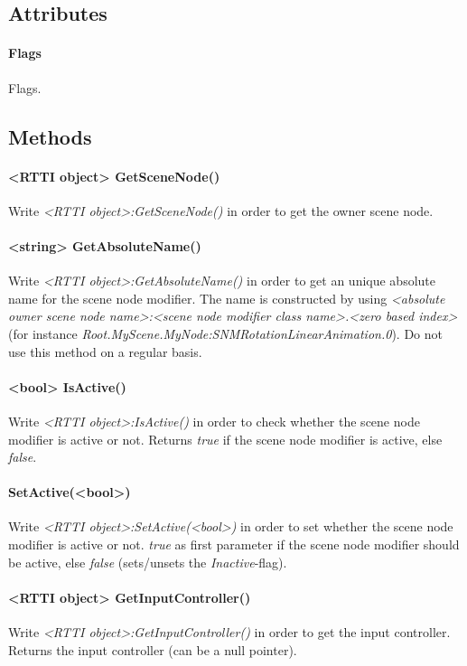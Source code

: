 \subsection{Attributes}

\paragraph{Flags}
Flags.


\subsection{Methods}

\paragraph{<RTTI object> GetSceneNode()}
Write \emph{<RTTI object>:GetSceneNode()} in order to get the owner scene node.

\paragraph{<string> GetAbsoluteName()}
Write \emph{<RTTI object>:GetAbsoluteName()} in order to get an unique absolute name for the scene node modifier. The name is constructed by using \emph{<absolute owner scene node name>:<scene node modifier class name>.<zero based index>} (for instance \emph{Root.MyScene.MyNode:SNMRotationLinearAnimation.0}). Do not use this method on a regular basis.

\paragraph{<bool> IsActive()}
Write \emph{<RTTI object>:IsActive()} in order to check whether the scene node modifier is active or not. Returns \emph{true} if the scene node modifier is active, else \emph{false}.

\paragraph{SetActive(<bool>)}
Write \emph{<RTTI object>:SetActive(<bool>)} in order to set whether the scene node modifier is active or not. \emph{true} as first parameter if the scene node modifier should be active, else \emph{false} (sets/unsets the \emph{Inactive}-flag).

\paragraph{<RTTI object> GetInputController()}
Write \emph{<RTTI object>:GetInputController()} in order to get the input controller. Returns the input controller (can be a null pointer).




